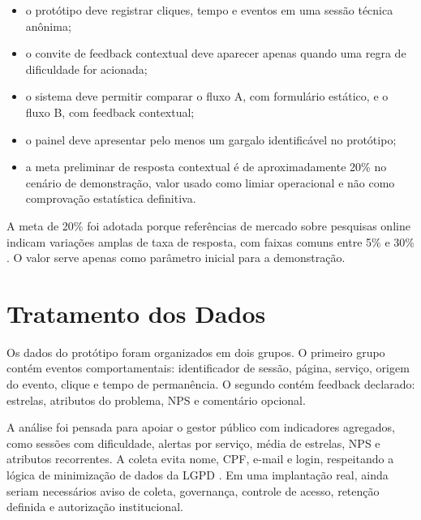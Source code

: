 \begin{itemize}
    \item o protótipo deve registrar cliques, tempo e eventos em uma sessão
    técnica anônima;
    \item o convite de feedback contextual deve aparecer apenas quando uma regra
    de dificuldade for acionada;
    \item o sistema deve permitir comparar o fluxo A, com formulário estático, e
    o fluxo B, com feedback contextual;
    \item o painel deve apresentar pelo menos um gargalo identificável no
    protótipo;
    \item a meta preliminar de resposta contextual é de aproximadamente 20\% no
    cenário de demonstração, valor usado como limiar operacional e não como
    comprovação estatística definitiva.
\end{itemize}

A meta de 20\% foi adotada porque referências de mercado sobre pesquisas online
indicam variações amplas de taxa de resposta, com faixas comuns entre 5\% e 30\%
\cite{delightedResponseRate,surveymonkeyResponseRate}. O valor serve apenas como
parâmetro inicial para a demonstração.

\section{Tratamento dos Dados}

Os dados do protótipo foram organizados em dois grupos. O primeiro grupo contém
eventos comportamentais: identificador de sessão, página, serviço, origem do
evento, clique e tempo de permanência. O segundo contém feedback declarado:
estrelas, atributos do problema, NPS e comentário opcional.

A análise foi pensada para apoiar o gestor público com indicadores agregados,
como sessões com dificuldade, alertas por serviço, média de estrelas, NPS e
atributos recorrentes. A coleta evita nome, CPF, e-mail e login, respeitando a
lógica de minimização de dados da LGPD \cite{brasil2018lgpd}. Em uma implantação
real, ainda seriam necessários aviso de coleta, governança, controle de acesso,
retenção definida e autorização institucional.
